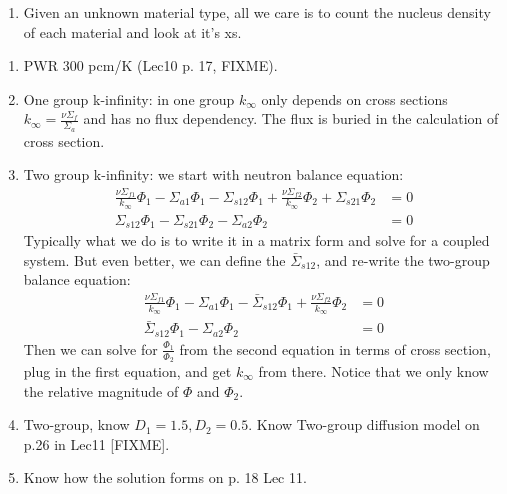 \documentclass{school-22.211-notes}
\begin{document}
\begin{enumerate}
\item Given an unknown material type, all we care is to count the nucleus density of each material and look at it's xs. 
\end{enumerate}

\begin{enumerate}
\item PWR 300 pcm/K (Lec10 p. 17, FIXME). 


\item One group k-infinity: in one group $k_{\infty}$ only depends on cross sections $k_{\infty} = \frac{\nu \Sigma_f}{\Sigma_a}$ and has no flux dependency. The flux is buried in the calculation of cross section.
\item Two group k-infinity: we start with neutron balance equation:
\begin{align}
\frac{\nu \Sigma_{f1}}{k_{\infty}} \Phi_1 - \Sigma_{a1} \Phi_1 - \Sigma_{s12} \Phi_1 + \frac{\nu \Sigma_{f2}}{k_{\infty}} \Phi_2 + \Sigma_{s21} \Phi_2 &= 0 \\
\Sigma_{s12} \Phi_1 - \Sigma_{s21} \Phi_2 - \Sigma_{a2} \Phi_2 &= 0 
\end{align}
Typically what we do is to write it in a matrix form and solve for a coupled system. But even better, we can define the  $\bar{\Sigma}_{s12}$, and re-write the two-group balance equation: 
\begin{align}
\frac{\nu \Sigma_{f1}}{k_{\infty}} \Phi_1 - \Sigma_{a1} \Phi_1 - \bar{\Sigma}_{s12} \Phi_1 + \frac{\nu \Sigma_{f2}}{k_{\infty}} \Phi_2 &= 0 \\
\bar{\Sigma}_{s12} \Phi_1- \Sigma_{a2} \Phi_2 &= 0 
\end{align}
Then we can solve for $\frac{\Phi_1}{\Phi_2}$ from the second equation in terms of cross section, plug in the first equation, and get $k_{\infty}$ from there. Notice that we only know the relative magnitude of $\Phi$ and $\Phi_2$. 

\item Two-group, know $D_1 = 1.5, D_2 = 0.5$. Know Two-group diffusion model on p.26 in Lec11 [FIXME].  

\item Know how the solution forms on p. 18 Lec 11. 
\end{enumerate}
\end{document}
